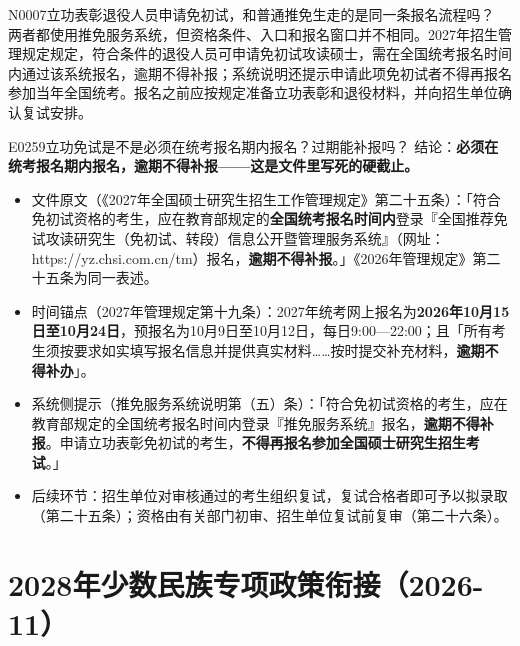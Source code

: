 \begin{qa}{N0007}{立功表彰退役人员申请免初试，和普通推免生走的是同一条报名流程吗？}
两者都使用推免服务系统，但资格条件、入口和报名窗口并不相同。2027年招生管理规定规定，符合条件的退役人员可申请免初试攻读硕士，需在全国统考报名时间内通过该系统报名，逾期不得补报；系统说明还提示申请此项免初试者不得再报名参加当年全国统考。报名之前应按规定准备立功表彰和退役材料，并向招生单位确认复试安排。
\end{qa}
\begin{qa}{E0259}{立功免试是不是必须在统考报名期内报名？过期能补报吗？}
结论：\textbf{必须在统考报名期内报名，逾期不得补报——这是文件里写死的硬截止。}
\begin{itemize}
  \item 文件原文（《2027年全国硕士研究生招生工作管理规定》第二十五条）：「符合免初试资格的考生，应在教育部规定的\textbf{全国统考报名时间内}登录『全国推荐免试攻读研究生（免初试、转段）信息公开暨管理服务系统』（网址：https://yz.chsi.com.cn/tm）报名，\textbf{逾期不得补报}。」《2026年管理规定》第二十五条为同一表述。
  \item 时间锚点（2027年管理规定第十九条）：2027年统考网上报名为\textbf{2026年10月15日至10月24日}，预报名为10月9日至10月12日，每日9:00—22:00；且「所有考生须按要求如实填写报名信息并提供真实材料……按时提交补充材料，\textbf{逾期不得补办}」。
  \item 系统侧提示（推免服务系统说明第（五）条）：「符合免初试资格的考生，应在教育部规定的全国统考报名时间内登录『推免服务系统』报名，\textbf{逾期不得补报}。申请立功表彰免初试的考生，\textbf{不得再报名参加全国硕士研究生招生考试}。」
  \item 后续环节：招生单位对审核通过的考生组织复试，复试合格者即可予以拟录取（第二十五条）；资格由有关部门初审、招生单位复试前复审（第二十六条）。
\end{itemize}
\end{qa}

\section{2028年少数民族专项政策衔接（2026-11）}

